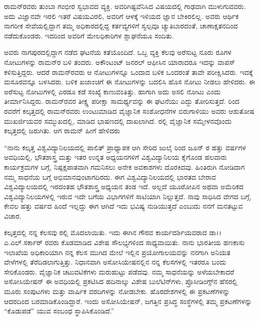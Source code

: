 
ರಾಮನ್‍ರವರು ತುಂಬಾ ಗಂಭೀರ ಸ್ವಭಾವದ ವ್ಯಕ್ತಿ. ಅವರಿಗಿಷ್ಟವೆನಿಸಿದ ವಿಷಯದಲ್ಲಿ ಗಾಢವಾಗಿ ಮುಳುಗುವವರು. ಅದು ವಿಜ್ಞಾನವೇ ಇರಲಿ ಇತರೆ ವಿಷಯವಿರಲಿ, ಅವರಿಗೆ ಆಳಕ್ಕೆ ಇಳಿಯದ ಜ್ಞಾನ ಬೇಕಿರಲಿಲ್ಲ. ಅವರು ಆರ್ಥಿಕ ನಾಗರೀಕ ಸೇವೆಯಲ್ಲಿದ್ದಾಗ ತಮ್ಮ ಅಧಿಕಾರದಲ್ಲಿದ್ದ ಕರ್ತವ್ಯಗಳಿಗೆ ಸ್ವಲ್ಪವೂ ಚ್ಯುತಿಬಾರದಂತೆ, ಚಾಣಾಕ್ಷತನದಿಂದ ನಡೆದುಕೊಂಡರು. ಇದರಿಂದ ಅವರಿಗೆ ಮೇಲಧಿಕಾರಿಗಳ ಶ್ಲಾಘನೆಯೂ ಸಂದಿತು.

ಅವರು ನಾಗಪುರದಲ್ಲಿದ್ದಾಗ ನಡೆದ ಘಟನೆಯ ಕತೆಯೊಂದಿದೆ. ಒಬ್ಬ ವ್ಯಕ್ತಿ ಕೆಲವು ಅರೆಸುಟ್ಟ ನೂರು ರೂಗಳ ನೋಟುಗಳನ್ನು ರಾಮನ್‍ರ ಬಳಿ ತಂದರು. ಅಕೌಂಟಂಟ್ ಜನರಲ್ ಆಫೀಸಿನ ಯಾರಾದರೂ ಇದನ್ನು ವಾಪಸ್ ಕಳಿಸುತ್ತಿದ್ದರು. ಆದರೆ ರಾಮನ್‍ರವರು ಆ ನೋಟುಗಳನ್ನೂ ಒಂದಾದ ಬಳಿಕ ಒಂದರಂತೆ ತಾವೇ ಪರೀಕ್ಷಿಸಿದರು. ಇದಕ್ಕೆ ಮಸೂರವನ್ನೂ ಬಳಸಿದರು. ಬಳಿಕ ಖಜಾಂಚಿಗೆ ಈ ನೋಟುಗಳನ್ನು ಬದಲಿಸಿ ಹೊಸ ನೋಟು ನೀಡಲು ಹೇಳಿದರು. ಈ ಅರೆಸುಟ್ಟ ನೋಟುಗಳಲ್ಲಿ ಎರಡೂ ಕಡೆ ಸಂಖ್ಯೆ ಕಾಣುವಂತಿತ್ತು. ಹಾಗಾಗಿ ಅದು ಅಸಲಿ ನೋಟು ಎಂದು ತೀರ್ಮಾನಿಸಿದ್ದರು. ರಾಮನ್‍ರವರ ತೀಕ್ಷ್ಣ ಪರೀಕ್ಷಾ ಸಾಮರ್ಥ್ಯವನ್ನು ಈ ಘಟನೆಯು ಎದ್ದು ತೋರಿಸುತ್ತದೆ.  ರಿಂದ  ರವರೆಗೆ ಕಲ್ಕತ್ತದಲ್ಲಿ ರಾಮನ್‍ರವರು ಉಂಟುಮಾಡಿದ ವೈಜ್ಞಾನಿಕ ಸಂಶೋಧನೆಗಳ ಬಿರುಗಾಳಿಯು ಅವರು ಆಶುತೋಷ ಮುಖರ್ಜಿಯವರ ಸಮ್ಮುಖದಲ್ಲಿ, ಮಾಡಿದ ಭಾಷಣದಲ್ಲಿ ದಾಖಲಾಗಿದೆ. ರಲ್ಲಿ ವೈಜ್ಞಾನಿಕ ಸಮ್ಮೇಳನವೊಂದು ಕಲ್ಕತ್ತದಲ್ಲಿ ಜರುಗಿತು. ಆಗ ರಾಮನ್ ಹೀಗೆ ಹೇಳಿದರು\enginline{-}

“ನಾನು ಕಲ್ಕತ್ತ ವಿಶ್ವವಿದ್ಯಾನಿಲಯದಲ್ಲಿ ಪಾಲಿತ್ ಪ್ರಾಧ್ಯಾಪಕ ಆಗಿ ಸೇರಿದ ಜುಲೈ  ರಿಂದ ಜೂನ್ ರ ಹತ್ತು ವರ್ಷಗಳ ಅವಧಿಯಲ್ಲಿ, ಭೌತಶಾಸ್ತ್ರ ಮತ್ತು ಇತರ ಉನ್ನತ ಅಧ್ಯಯನಗಳಿಗೆ ವಿಶ್ವವಿದ್ಯಾನಿಲಯ ಕೈಗೊಂಡ ಹಲವಾರು ಕಾರ್ಯಕ್ರಮಗಳ ಬಗ್ಗೆ, ನಿಷ್ಪಕ್ಷಪಾತವಾಗಿ ಗಮನಿಸಲು ಅನೇಕ ಅವಕಾಶಗಳು ದೊರಕಿದವು. ಹಿಂತಿರುಗಿ ನೋಡಿದಾಗ ನಮ್ಮ ಸಾಧನೆಯ ಬಗ್ಗೆ ಅಭಿಮಾನವುಂಟಾಗದಿರದು. ಈಗ ವಿಶ್ವವಿದ್ಯಾನಿಲಯದಲ್ಲಿ ಭಾರತದ ಬೇರಾವ ವಿಶ್ವವಿದ್ಯಾಲಯದಲ್ಲಿ ಇರದಂತಹ ಭೌತಶಾಸ್ತ್ರ ಅಧ್ಯಯನ ತಂಡ ಇದೆ. ಅಲ್ಲದೆ ಯೂರೋಪಿನ ಅಥವಾ ಅಮೆರಿಕದ ವಿಶ್ವವಿದ್ಯಾನಿಲಯಗಳಲ್ಲಿ ಇರುವ ಇದೇ ಬಗೆಯ ವಿಭಾಗಗಳಿಗೆ ಸಾಟಿಯಾಗಿ ನಿಲ್ಲುತ್ತದೆ. ನಾವು ಸಾಧಿಸಿದ ವೇಗದ ಬಗ್ಗೆ, ಕೇವಲ ಹತ್ತು ವರ್ಷದ ಹಿಂದೆ ಇಲ್ಲದ್ದು ಈಗ ಆಗಿದೆ ಇದು ಭವಿಷ್ಯ ನುಡಿಯುತ್ತದೆ ಎಂಬುದು ನನಗೆ ಮನತಟ್ಟುವ ವಿಚಾರ.

ಕಲ್ಕತ್ತದಲ್ಲಿ ನನ್ನ ಕೆಲಸವು ರಲ್ಲಿ ಮೊದಲಾಯಿತು. ಇದು ಈಗಿನ ಗೌರವ ಕಾರ್ಯದರ್ಶಿ\-ಯವರಾದ ಡಾ।। ಎ.ಎಲ್.ಸರ್ಕಾರ್ ರವರು ಕೊಡಮಾಡಿದ ವಿಶೇಷ ಸೌಲಭ್ಯಗಳಿಂದ ಸಾಧ್ಯವಾಯಿತು. ನಾನು ಭಾರತೀಯ ಹಣಕಾಸು ಇಲಾಖೆಯ ಅಧಿಕಾರಿಯಾಗಿ ನನ್ನ ಕೆಲಸ ಮುಗಿದ ಮೇಲೆ ಇಲ್ಲಿನ ಪ್ರಯೋಗಾಲಯವನ್ನು ನನಗಾಗಿ ಅನಿಯತ ವೇಳೆಗಳಲ್ಲಿ ತೆರೆದಿಡಲಾಗುತ್ತಿತ್ತು. ನಿಧಾನವಾಗಿ ಅಸೋಸಿಯೇಷನಲ್ಲಿನ ನನ್ನ ಕೆಲಸಗಳಲ್ಲಿ ಇತರರೂ ಬಂದು ಸೇರಿಕೊಂಡರು. ವೈಜ್ಞಾನಿಕ ಚಟುವಟಿಕೆ\-ಗಳು ಮರುಹುಟ್ಟು ಪಡೆದವು. ನಮ್ಮ ಸಾಧನೆಯನ್ನು ಅಳೆಯಬೇಕಾದರೆ ಅಸೋಸಿಯೇಷನ್ ಈ ಅವಧಿಯಲ್ಲಿ ಪ್ರಕಟಿಸಿದ ಹದಿನಾಲ್ಕು ವಿಶೇಷ ಬುಲೆಟಿನ್‍ಗಳು, ಪ್ರೊಸೀಡಿಂಗ್ಸ್‌ನ ಹೆಸರಲ್ಲಿ ಮೂರು ಸಂಪುಟಗಳು ಮತ್ತು ವಾರ್ಷಿಕ ವರದಿಗಳನ್ನು ನೋಡಬೇಕು. ಹೊರದೇಶಗಳಲ್ಲಿ ಈ ಪ್ರಕಟಣೆಗಳನ್ನು ಆದರದಿಂದ ಬರಮಾಡಿಕೊಂಡಿದ್ದಾರೆ. ಇಂದು ಅಸೋಸಿಯೇಷನ್, ಜಗತ್ತಿನ ಪ್ರಸಿದ್ಧ ಸಂಸ್ಥೆಗಳಲ್ಲಿ ತಮ್ಮ ಪ್ರಕಟಣೆಗಳನ್ನು “ಕೊಡುಪಡೆ” ಯುವ ಸಂಬಂಧ ಸ್ಥಾಪಿಸಿಕೊಂಡಿದೆ.”

